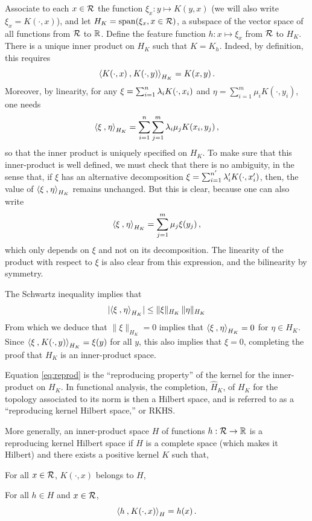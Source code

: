 Associate to each $x\in {\mathcal R}$ the function $\xi_x: y \mapsto K(y,x)$ (we will also write $\xi_x = K(\cdot, x)$), and let $H_K = \mathrm{span}(\xi_x, x\in {\mathcal R})$, a subspace of the vector space of all functions from ${\mathcal R}$ to ${\mathbb{R}}$. Define the feature function $h: x\mapsto \xi_x$ from ${\mathcal R}$ to $H_K$. There is a unique inner product on $H_K$ such that $K = K_h$. Indeed, by definition, this requires
\begin{equation}
\label{eq:reprod}
{\langle {K(\cdot, x)}\mathbin{,} {K(\cdot, y)}\rangle}_{H_K} = K(x,y)\,.
\end{equation}
Moreover, by linearity, for any $\xi = \sum_{i=1}^n \lambda_i K(\cdot, x_i)$ and $\eta = \sum_{i=1}^m \mu_i K(\cdot, y_i)$, one needs
\[
{\langle {\xi}\mathbin{,} {\eta}\rangle}_{H_K} = \sum_{i=1}^n\sum_{j=1}^m \lambda_i\mu_j K(x_i, y_j)\,,
\]
so that the inner product is uniquely specified on $H_K$.
To make sure that this inner-product is well defined, we must check that there is no ambiguity, in the sense that, if $\xi$ has an alternative decomposition $\xi = \sum_{i=1}^{n'} \lambda'_i K(\cdot, x'_i)$, then, the value of ${\langle {\xi}\mathbin{,} {\eta}\rangle}_{H_K}$ remains unchanged. But this is clear, because one can also write
\[
{\langle {\xi}\mathbin{,} {\eta}\rangle}_{H_K} = \sum_{j=1}^m \mu_j \xi(y_j)\,,
\]
which only depends on $\xi$ and not on its decomposition. The linearity of the product with respect to $\xi$ is also clear from this expression, and the bilinearity by symmetry. 

The Schwartz inequality implies that 
\[
|{\langle {\xi}\mathbin{,} {\eta}\rangle}_{H_K}| \leq \|\xi\|_{H_K}\,\|\eta\|_{H_K}
\]
From which we deduce that $\|\xi\|_{H_K} = 0$ implies that ${\langle {\xi}\mathbin{,} {\eta}\rangle}_{H_K}=0$ for $\eta\in H_K$. Since 
${\langle {\xi}\mathbin{,} {K(\cdot, y)}\rangle}_{H_K} = \xi(y)$ for all $y$, this also implies that $\xi=0$, completing the proof that $H_K$ is an inner-product space.
\bigskip

Equation \eqref{eq:reprod} is the ``reproducing property'' of the kernel for the inner-product on $H_K$. In functional analysis, the completion, $\hat H_K$, of $H_K$ for the topology associated to its norm is then a Hilbert space, and is referred to as a ``reproducing kernel Hilbert space,'' or RKHS. 

More generally, an inner-product space $H$ of functions $h: {\mathcal R} \to {\mathbb{R}}$ is a reproducing kernel Hilbert space if $H$ is a complete space (which makes it Hilbert) and there exists a positive kernel $K$ such that, 
\begin{enumerate}[label={[RKHS\arabic*]}, wide=0pt]
\item For all $x\in {\mathcal R}$, $K(\cdot, x)$ belongs to $H$,
\item For all $h\in H$ and $x\in {\mathcal R}$, 
\[
{\langle {h}\mathbin{,} {K(\cdot, x)}\rangle}_H = h(x)\,.
\] 
\end{enumerate}



